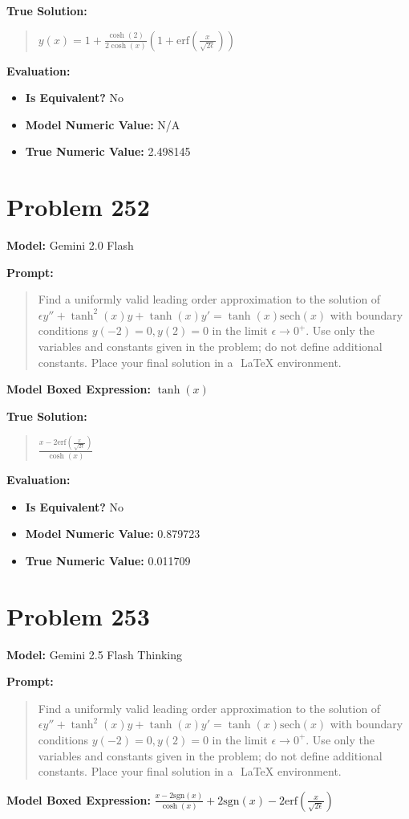 \documentclass{article}
\begin{document}
{\textbf{True Solution:}
\begin{quote}
$y(x)=1+\frac{\cosh(2)}{2\cosh(x)}(1+\text{erf}(\frac{x}{\sqrt{2\epsilon}}))$
\end{quote}

\textbf{Evaluation:}
\begin{itemize}
\item \textbf{Is Equivalent?} No
\item \textbf{Model Numeric Value:} N/A
\item \textbf{True Numeric Value:} 2.498145
\end{itemize}
\vspace{1cm}
\section*{Problem 252}
\textbf{Model:} Gemini 2.0 Flash

\textbf{Prompt:}
\begin{quote}
Find a uniformly valid leading order approximation to the solution of $\epsilon y'' + \tanh^2(x)y + \tanh(x)y'=\tanh(x)\text{sech}(x)$ with boundary conditions $y(-2)=0, y(2)=0$ in the limit $\epsilon \to 0^+$. Use only the variables and constants given in the problem; do not define additional constants. Place your final solution in a $\boxed{}$ LaTeX environment.
\end{quote}
\textbf{Model Boxed Expression:} $\tanh(x)$

\textbf{True Solution:}
\begin{quote}
$\frac{x-2\text{erf}(\frac{x}{\sqrt{2\epsilon}})}{\cosh(x)}$
\end{quote}

\textbf{Evaluation:}
\begin{itemize}
\item \textbf{Is Equivalent?} No
\item \textbf{Model Numeric Value:} 0.879723
\item \textbf{True Numeric Value:} 0.011709
\end{itemize}
\vspace{1cm}
\section*{Problem 253}
\textbf{Model:} Gemini 2.5 Flash Thinking

\textbf{Prompt:}
\begin{quote}
Find a uniformly valid leading order approximation to the solution of $\epsilon y'' + \tanh^2(x)y + \tanh(x)y'=\tanh(x)\text{sech}(x)$ with boundary conditions $y(-2)=0, y(2)=0$ in the limit $\epsilon \to 0^+$. Use only the variables and constants given in the problem; do not define additional constants. Place your final solution in a $\boxed{}$ LaTeX environment.
\end{quote}
\textbf{Model Boxed Expression:} $\frac{x-2\text{sgn}(x)}{\cosh(x)} + 2\text{sgn}(x) - 2\text{erf}\left(\frac{x}{\sqrt{2\epsilon}}\right)$

}
\end{document}
